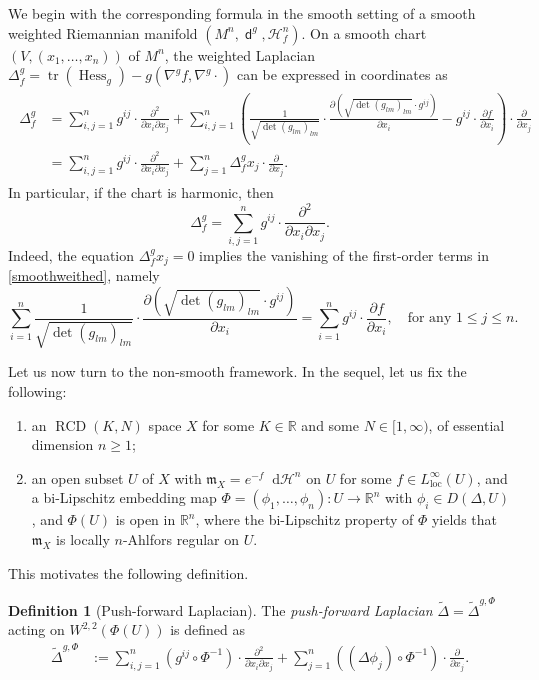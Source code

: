 \documentclass[11pt,reqno]{amsart}
\theoremstyle{definition}
\newtheorem{definition}[theorem]{Definition}
\numberwithin{equation}{section}
\newcommand{\di}{\mathop{}\!\mathrm{d}}
\newcommand{\meas}{\mathfrak{m}}
\DeclareMathOperator{\dist}{\mathsf{d}}
\DeclareMathOperator{\Hess}{Hess}
\DeclareMathOperator{\loc}{loc}
\DeclareMathOperator{\RCD}{RCD}
\DeclareMathOperator{\tr}{tr}
\newcommand{\haus}{\mathscr{H}}
\begin{document}
We begin with the corresponding formula in the smooth setting of a smooth weighted Riemannian manifold $(M^n, \dist^g, \haus^n_f)$.
On a smooth chart $(V, (x_1, \ldots, x_n))$ of $M^n$, 
 the weighted Laplacian $\Delta^g_f=\tr(\Hess_g)-g(\nabla^g f, \nabla^g \cdot)$ can be expressed in coordinates as 
\begin{align}\begin{split}
\label{smoothweithed}
\Delta_f^g&=\sum_{i, j = 1}^n g^{ij}\cdot\frac{\partial^2}{\partial x_i \partial x_j}+\sum_{i, j = 1}^n \left(\frac{1}{\sqrt{\det (g_{lm})_{lm}}} \cdot \frac{\partial (\sqrt{\det (g_{lm})_{lm}} \cdot g^{ij})}{\partial x_i} - g^{ij}\cdot\frac{\partial f}{\partial x_i}\right) \cdot\frac{\partial}{\partial x_j}  \\
&=\sum_{i, j = 1}^n g^{ij}\cdot\frac{\partial^2}{\partial x_i \partial x_j}+\sum_{j = 1}^n\Delta_f^gx_j\cdot\frac{\partial}{\partial x_j}.
\end{split}
\end{align}
In particular, if the chart is harmonic, then 
\begin{equation}\label{harmocood}
\Delta_f^g=\sum_{i, j =1}^n g^{ij}\cdot\frac{\partial^2}{\partial x_i \partial x_j}.
\end{equation}
Indeed, the equation $\Delta_f^gx_j=0$ implies the  vanishing of the first-order terms in \eqref{smoothweithed}, namely
\begin{equation}
\sum_{i = 1}^n \frac{1}{\sqrt{\det (g_{lm})_{lm}}}\cdot \frac{\partial (\sqrt{\det (g_{lm})_{lm}} \cdot g^{ij})}{\partial x_i} = \sum_{i = 1}^n g^{ij}\cdot\frac{\partial f}{\partial x_i}, \quad \text{for any $1 \leq j \leq n$.}
\end{equation}

Let us now turn to the non-smooth framework.
In the sequel, let us fix the following:
\begin{enumerate}
    \item an $\RCD(K, N)$ space $X$ for some $K \in \mathbb{R}$ and some $N \in [1, \infty)$, of essential dimension $n \ge 1$;
    \item an open subset $U$ of $X$ with $\meas_X=e^{-f}\di \haus^n$  
on $U$ for some  $f \in L^{\infty}_{\loc}(U)$, and a bi-Lipschitz embedding map $\Phi=(\phi_1, \ldots, \phi_n):U \to \mathbb{R}^n$ with $\phi_i \in D(\Delta, U)$, and $\Phi(U)$ is open in $\mathbb{R}^n$, where the bi-Lipschitz property of $\Phi$ yields that $\meas_X$ is locally $n$-Ahlfors regular on $U$. 
    
\end{enumerate} 
This motivates the following definition.
\begin{definition}[Push-forward Laplacian]\label{plap}
  The \textit{push-forward Laplacian} $\tilde \Delta=\tilde \Delta^{g, \Phi}$ acting on $W^{2,2}(\Phi(U))$ is defined as 
\begin{align*}
\tilde \Delta^{g, \Phi}
 & :=  \sum_{i, j=1}^n\left( g^{ij}\circ \Phi^{-1}  \right) \cdot \frac{\partial^2}{\partial x_i\partial x_j} + \sum_{j=1}^n\left( (\Delta \phi_j)\circ \Phi^{-1} \right) \cdot \frac{\partial}{\partial x_j}. 
\end{align*}
\end{definition}
\end{document}
